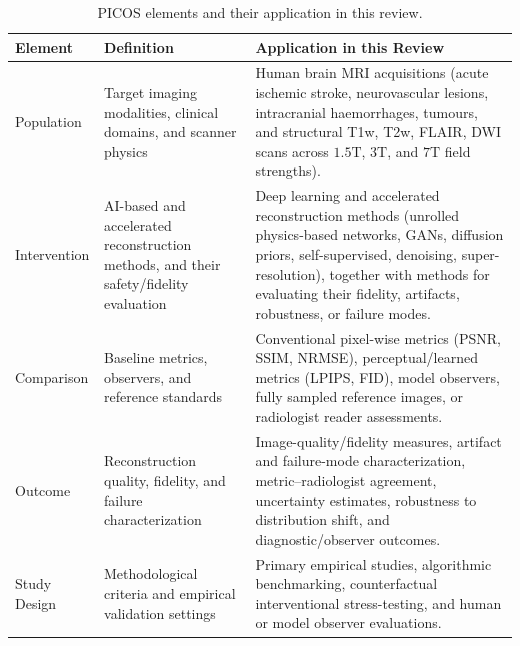 \documentclass[review,authoryear]{elsarticle}
\begin{document}
\begin{table}[t]
\centering
\caption{PICOS elements and their application in this review.}
\label{tab:picos}
\footnotesize
\setlength{\tabcolsep}{5pt}
\renewcommand{\arraystretch}{1.18}
\begin{tabular}{>{\raggedright\arraybackslash}p{} >{\raggedright\arraybackslash}p{} >{\raggedright\arraybackslash}p{}}
\hline
\textbf{Element} & \textbf{Definition} & \textbf{Application in this Review} \\
\hline
Population & Target imaging modalities, clinical domains, and scanner physics & Human brain MRI acquisitions (acute ischemic stroke, neurovascular lesions, intracranial haemorrhages, tumours, and structural T1w, T2w, FLAIR, DWI scans across $1.5\text{T}$, $3\text{T}$, and $7\text{T}$ field strengths). \\
Intervention & AI-based and accelerated reconstruction methods, and their safety/fidelity evaluation & Deep learning and accelerated reconstruction methods (unrolled physics-based networks, GANs, diffusion priors, self-supervised, denoising, super-resolution), together with methods for evaluating their fidelity, artifacts, robustness, or failure modes. \\
Comparison & Baseline metrics, observers, and reference standards & Conventional pixel-wise metrics (PSNR, SSIM, NRMSE), perceptual/learned metrics (LPIPS, FID), model observers, fully sampled reference images, or radiologist reader assessments. \\
Outcome & Reconstruction quality, fidelity, and failure characterization & Image-quality/fidelity measures, artifact and failure-mode characterization, metric--radiologist agreement, uncertainty estimates, robustness to distribution shift, and diagnostic/observer outcomes. \\
Study Design & Methodological criteria and empirical validation settings & Primary empirical studies, algorithmic benchmarking, counterfactual interventional stress-testing, and human or model observer evaluations. \\
\hline
\end{tabular}
\end{table}
\end{document}

